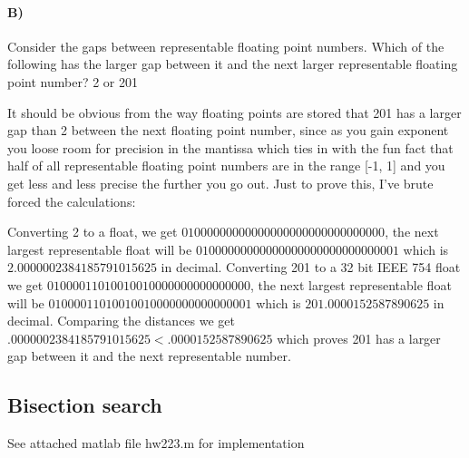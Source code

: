 \documentclass{article}
\begin{document}
\paragraph{B)}
Consider the gaps between representable floating point numbers. Which of the following has the larger gap between it and the next larger representable floating point number? 2 or 201

It should be obvious from the way floating points are stored that 201 has a larger gap than 2 between the next floating point number, since as you gain exponent you loose room for precision in the mantissa which ties in with the fun fact that half of all representable floating point numbers are in the range [-1, 1] and you get less and less precise the further you go out. Just to prove this, I've brute forced the calculations: 

Converting 2 to a float, we get $01000000000000000000000000000000$, the next largest representable float will be $01000000000000000000000000000001$ which is $2.0000002384185791015625$ in decimal. Converting 201 to a 32 bit IEEE 754 float we get $01000011010010010000000000000000$, the next largest representable float will be $01000011010010010000000000000001$ which is $201.0000152587890625$ in decimal. Comparing the distances we get $.0000002384185791015625 < .0000152587890625$ which proves 201 has a larger gap between it and the next representable number. 

\subsection{Bisection search}
See attached matlab file hw223.m for implementation 
\end{document}
